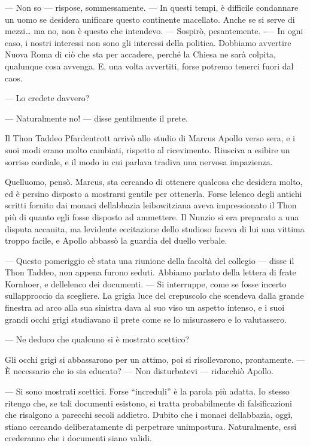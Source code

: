 	--- Non so --- rispose, sommessamente. --- In questi tempi, è difficile
	condannare un uomo se desidera unificare questo continente macellato.
	Anche se si serve di mezzi\ldots{} ma no, non è questo che intendevo.
	--- Sospirò, pesantemente. -\/--- In ogni caso, i nostri interessi non
	sono gli interessi della politica. Dobbiamo avvertire Nuova Roma di ciò
	che sta per accadere, perché la Chiesa ne sarà colpita, qualunque cosa
	avvenga. E, una volta avvertiti, forse potremo tenerci fuori dal caos.
	
	--- Lo credete davvero?
	
	--- Naturalmente no! --- disse gentilmente il prete.
	
	Il Thon Taddeo Pfardentrott arrivò allo studio di Marcus Apollo verso
	sera, e i suoi modi erano molto cambiati, rispetto al ricevimento.
	Riusciva a esibire un sorriso cordiale, e il modo in cui parlava tradiva
	una nervosa impazienza.
	
	Quell\textquotesingle uomo, pensò. Marcus, sta cercando di ottenere
	qualcosa che desidera molto, ed è persino disposto a mostrarsi gentile
	per ottenerla. Forse l\textquotesingle elenco degli antichi scritti
	fornito dai monaci dell\textquotesingle abbazia leibowitziana aveva
	impressionato il Thon più di quanto egli fosse disposto ad ammettere. Il
	Nunzio si era preparato a una disputa accanita, ma
	l\textquotesingle evidente eccitazione dello studioso faceva di lui una
	vittima troppo facile, e Apollo abbassò la guardia del duello verbale.
	
	--- Questo pomeriggio c\textquotesingle è stata una riunione della
	facoltà del collegio --- disse il Thon Taddeo, non appena furono seduti.
	Abbiamo parlato della lettera di frate Kornhoer, e
	dell\textquotesingle elenco dei documenti. --- Si interruppe, come se
	fosse incerto sull\textquotesingle approccio da scegliere. La grigia
	luce del crepuscolo che scendeva dalla grande finestra ad arco alla sua
	sinistra dava al suo viso un aspetto intenso, e i suoi grandi occhi
	grigi studiavano il prete come se lo misurassero e lo valutassero.
	
	--- Ne deduco che qualcuno si è mostrato scettico?
	
	Gli occhi grigi si abbassarono per un attimo, poi si risollevarono,
	prontamente. --- È necessario che io sia educato? --- Non disturbatevi
	--- ridacchiò Apollo.
	
	--- Si sono mostrati scettici. Forse ``increduli'' è la parola più
	adatta. Io stesso ritengo che, se tali documenti esistono, si tratta
	probabilmente di falsificazioni che risalgono a parecchi secoli
	addietro. Dubito che i monaci dell\textquotesingle abbazia, oggi, stiano
	cercando deliberatamente di perpetrare un\textquotesingle impostura.
	Naturalmente, essi crederanno che i documenti siano validi.
	
